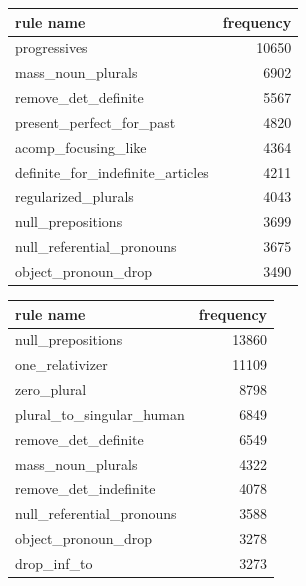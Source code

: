 \documentclass[11pt]{article}
\begin{document}
\begin{center}
\begin{tabular}{lr}
\hline
\textbf{rule name}                  & \textbf{frequency} \\ \hline
progressives                        & 10650              \\
mass\_noun\_plurals                 & 6902               \\
remove\_det\_definite               & 5567               \\
present\_perfect\_for\_past         & 4820               \\
acomp\_focusing\_like               & 4364               \\
definite\_for\_indefinite\_articles & 4211               \\
regularized\_plurals                & 4043               \\
null\_prepositions                  & 3699               \\
null\_referential\_pronouns         & 3675               \\
object\_pronoun\_drop               & 3490               \\ \hline
\end{tabular}
\end{center}

\begin{center}
\begin{tabular}{lr}
\hline
\textbf{rule name}          & \textbf{frequency} \\ \hline
null\_prepositions          & 13860              \\
one\_relativizer            & 11109              \\
zero\_plural                & 8798               \\
plural\_to\_singular\_human & 6849               \\
remove\_det\_definite       & 6549               \\
mass\_noun\_plurals         & 4322               \\
remove\_det\_indefinite     & 4078               \\
null\_referential\_pronouns & 3588               \\
object\_pronoun\_drop       & 3278               \\
drop\_inf\_to               & 3273               \\ \hline
\end{tabular}
\end{center}
\end{document}
